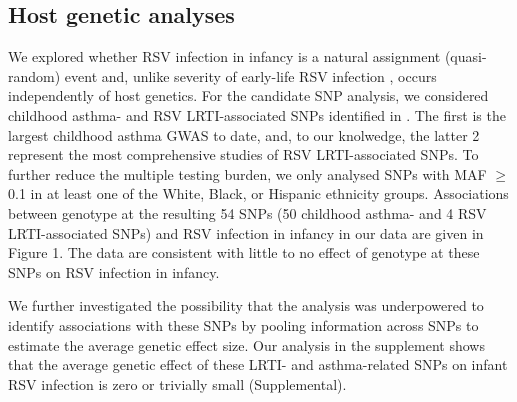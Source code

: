 \documentclass{article} %
\begin{document}
\clearpage										

\subsection{Host genetic analyses}
We explored whether RSV infection in infancy is a natural assignment (quasi-random) event and, unlike severity of early-life RSV infection 
\citep{larkin2015genes},
 occurs independently of host genetics. 
 For the candidate SNP analysis, we considered childhood asthma- and RSV
LRTI-associated SNPs identified in 
\citet{pividori2019shared, janssen2007genetic, pasanen2017genome}. The first is the largest childhood asthma GWAS to date, and, to our knolwedge, the latter 2 represent the most comprehensive studies of RSV LRTI-associated
SNPs. To further reduce the multiple testing burden, we only analysed SNPs with MAF $\ge$ 0.1 in at least one of the White, Black, or Hispanic ethnicity groups. Associations between genotype at the resulting 54 SNPs (50 childhood asthma- and 4 RSV LRTI-associated SNPs) and RSV infection in infancy in our data are given in Figure 1. The data are consistent with little to no effect of genotype at these SNPs on RSV infection in infancy.

We further investigated the possibility that the analysis was underpowered to identify associations with these SNPs by pooling information across SNPs to estimate the average genetic effect
size. Our analysis in the supplement shows that the average genetic effect of these LRTI- and asthma-related SNPs on infant RSV infection is zero or trivially small (Supplemental).
\end{document}
